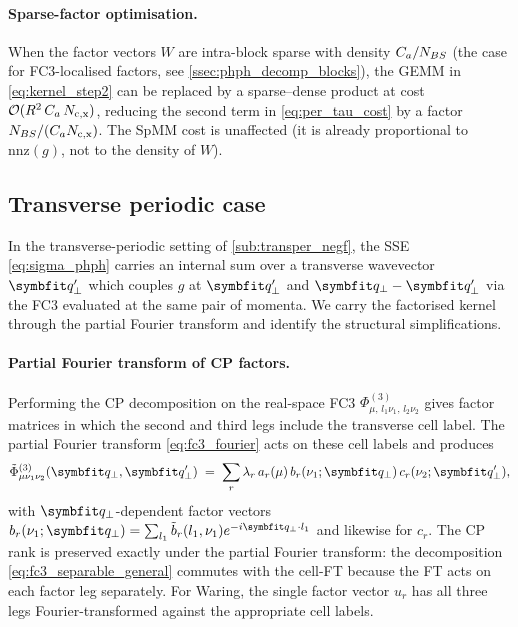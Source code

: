 \paragraph{Sparse-factor optimisation.}
When the factor vectors $W$ are intra-block sparse with density
$C_a/N_{BS}$ (the case for FC3-localised factors, see
\cref{ssec:phph_decomp_blocks}), the GEMM in
\cref{eq:kernel_step2} can be replaced by a sparse--dense product at
cost $\mathcal{O}(R^{2}\,C_a\,N_\mathrm{c,x})$, reducing the second term in
\cref{eq:per_tau_cost} by a factor $N_{BS}/(C_a N_\mathrm{c,x})$. The
SpMM cost is unaffected (it is already proportional to
$\mathrm{nnz}(g)$, not to the density of $W$).

\subsection{Transverse periodic case}
\label{ssec:phph_decomp_qspace}

In the transverse-periodic setting of \cref{sub:transper_negf}, the
SSE \cref{eq:sigma_phph} carries an internal sum over a transverse
wavevector $\qp'$ which couples $g$ at $\qp'$ and $\qp-\qp'$ via the
FC3 evaluated at the same pair of momenta. We carry the
factorised kernel through the partial Fourier transform and identify
the structural simplifications.

\paragraph{Partial Fourier transform of CP factors.}
Performing the CP decomposition on the real-space FC3
$\Phi^{(3)}_{\mu,\,l_1\nu_1,\,l_2\nu_2}$ gives factor matrices in
which the second and third legs include the transverse cell label.
The partial Fourier transform \cref{eq:fc3_fourier} acts on these
cell labels and produces
\begin{equation}\label{eq:cp_fourier_decomp}
  \tilde\Phi^{(3)}_{\mu\nu_1\nu_2}(\qp,\qp')
  \;=\; \sum_{r}\lambda_r\,a_r(\mu)\,b_r(\nu_1;\qp)\,c_r(\nu_2;\qp'),
\end{equation}
with $\qp$-dependent factor vectors
$b_r(\nu_1;\qp)=\sum_{l_1}\tilde b_r(l_1,\nu_1)e^{-i\qp\cdot l_1}$ and
likewise for $c_r$. The CP rank is preserved exactly under the
partial Fourier transform: the decomposition
\cref{eq:fc3_separable_general} commutes with the cell-FT because the
FT acts on each factor leg separately. For Waring, the single
factor vector $u_r$ has all three legs Fourier-transformed against
the appropriate cell labels.


